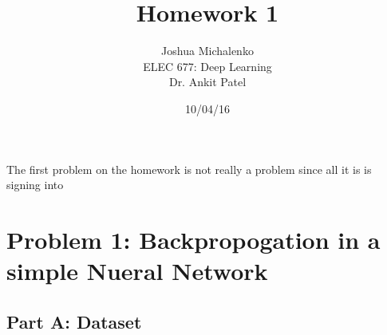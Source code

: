 \documentclass[]{article}
\begin{document}
\title{Homework 1}
\author{Joshua Michalenko\\ ELEC 677: Deep Learning \\  Dr. Ankit Patel}
\date{10/04/16}
\maketitle

The first problem on the homework is not really a problem since all it is is signing into 
\section{Problem 1: Backpropogation in a simple Nueral Network}
\subsection{Part A:  Dataset}
\end{document}

